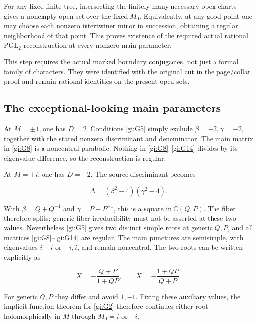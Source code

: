For any fixed finite tree, intersecting the finitely many
necessary open charts gives a nonempty open set over the
fixed \(M_0\). Equivalently, at any good point one may choose
each nonzero intertwiner minor in succession, obtaining a
regular neighborhood of that point. This proves existence of
the required actual rational \(\mathrm{PGL}_2\) reconstruction
at every nonzero main parameter.

This step requires the actual marked boundary conjugacies,
not just a formal family of characters. They were identified
with the original cut in the page/collar proof and remain
rational identities on the present open sets.

\subsection{The exceptional-looking main parameters}\label{gi:the-exceptional-looking-main-parameters}

At \(M=\pm1\), one has \(D=2\). Conditions \eqref{gi:G5} simply
exclude \(\beta=-2,\gamma=-2\), together with the stated
nonzero discriminant and denominator. The main matrix in
\eqref{gi:G8} is a noncentral parabolic. Nothing in \eqref{gi:G8}--\eqref{gi:G14} divides
by its eigenvalue difference, so the reconstruction is regular.

At \(M=\pm i\), one has \(D=-2\). The source discriminant
becomes

\begin{equation}\label{gi:G15}
\Delta=(\beta^2-4)(\gamma^2-4).
\end{equation}

With \(\beta=Q+Q^{-1}\) and \(\gamma=P+P^{-1}\),
this is a square in \(\mathbb C(Q,P)\). The fiber therefore
splits; generic-fiber irreducibility must not be asserted
at these two values. Nevertheless \eqref{gi:G5} gives two distinct
simple roots at generic \(Q,P\), and all matrices \eqref{gi:G8}--\eqref{gi:G14}
are regular. The main punctures are semisimple, with
eigenvalues \(i,-i\) or \(-i,i\), and remain noncentral.
The two roots can be written explicitly as

\begin{equation}\label{gi:G15a}
X=-\frac{Q+P}{1+QP},\qquad
             X=-\frac{1+QP}{Q+P}.
\end{equation}

For generic \(Q,P\) they differ and avoid \(1,-1\).
Fixing these auxiliary values, the implicit-function theorem
for \eqref{gi:G2} therefore continues either root holomorphically in
\(M\) through \(M_0=i\) or \(-i\).

